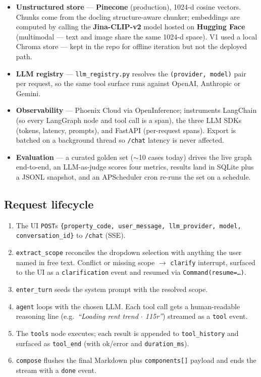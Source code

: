 \documentclass[11pt,a4paper]{article}
\begin{document}
\begin{itemize}
  \item \textbf{Unstructured store} --- \textbf{Pinecone} (production), 1024-d cosine
  vectors. Chunks come from the docling structure-aware chunker; embeddings are computed
  by calling the \textbf{Jina-CLIP-v2} model hosted on \textbf{Hugging Face} (multimodal
  --- text and image share the same 1024-d space). V1 used a local Chroma store --- kept in the
  repo for offline iteration but not the deployed path.

  \item \textbf{LLM registry} --- \texttt{llm\_registry.py} resolves the
  \texttt{(provider, model)} pair per request, so the same tool surface runs against
  OpenAI, Anthropic or Gemini.

  \item \textbf{Observability} --- Phoenix Cloud via OpenInference; instruments LangChain
  (so every LangGraph node and tool call is a span), the three LLM SDKs (tokens, latency,
  prompts), and FastAPI (per-request spans). Export is batched on a background thread so
  \texttt{/chat} latency is never affected.

  \item \textbf{Evaluation} --- a curated golden set ($\sim$10 cases today) drives the live
  graph end-to-end, an LLM-as-judge scores four metrics, results land in SQLite plus a
  JSONL snapshot, and an APScheduler cron re-runs the set on a schedule.
\end{itemize}

\subsection{Request lifecycle}

\begin{enumerate}
  \item The UI \texttt{POST}s
  \texttt{\{property\_code, user\_message, llm\_provider, model, conversation\_id\}} to
  \texttt{/chat} (SSE).
  \item \texttt{extract\_scope} reconciles the dropdown selection with anything the user
  named in free text. Conflict or missing scope $\rightarrow$ \texttt{clarify} interrupt,
  surfaced to the UI as a \texttt{clarification} event and resumed via
  \texttt{Command(resume=\dots)}.
  \item \texttt{enter\_turn} seeds the system prompt with the resolved scope.
  \item \texttt{agent} loops with the chosen LLM. Each tool call gets a human-readable
  reasoning line (e.g.\ \emph{``Loading rent trend $\cdot$ 115r''}) streamed as a
  \texttt{tool} event.
  \item The \texttt{tools} node executes; each result is appended to \texttt{tool\_history}
  and surfaced as \texttt{tool\_end} (with ok/error and \texttt{duration\_ms}).
  \item \texttt{compose} flushes the final Markdown plus \texttt{components[]} payload and
  ends the stream with a \texttt{done} event.
\end{enumerate}
\end{document}
